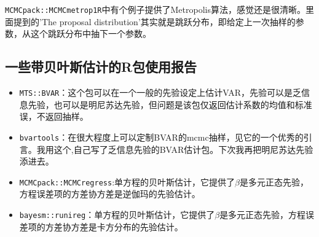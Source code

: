 \documentclass[
]{book}
\providecommand{\tightlist}{%
  \setlength{\itemsep}{0pt}\setlength{\parskip}{0pt}}
\begin{document}
\texttt{MCMCpack::MCMCmetrop1R}中有个例子提供了Metropolis算法，感觉还是很清晰。里面提到的'The proposal distribution'其实就是跳跃分布，即给定上一次抽样的参数，从这个跳跃分布中抽下一个参数。

\hypertarget{ux4e00ux4e9bux5e26ux8d1dux53f6ux65afux4f30ux8ba1ux7684rux5305ux4f7fux7528ux62a5ux544a}{%
\subsection{一些带贝叶斯估计的R包使用报告}\label{ux4e00ux4e9bux5e26ux8d1dux53f6ux65afux4f30ux8ba1ux7684rux5305ux4f7fux7528ux62a5ux544a}}

\begin{itemize}
\tightlist
\item
  \texttt{MTS::BVAR}：这个包可以在一个一般的先验设定上估计VAR，先验可以是乏信息先验，也可以是明尼苏达先验，但问题是该包仅返回估计系数的均值和标准误，不返回抽样。
\item
  \texttt{bvartools}：在很大程度上可以定制BVAR的mcmc抽样，见它的一个优秀的引言。我用这个,自己写了乏信息先验的BVAR估计包。下次我再把明尼苏达先验添进去。
\item
  \texttt{MCMCpack::MCMCregress}:单方程的贝叶斯估计，它提供了\(\beta\)是多元正态先验，方程误差项的方差协方差是逆伽玛的先验估计。
\item
  \texttt{bayesm::runireg}：单方程的贝叶斯估计，它提供了\(\beta\)是多元正态先验，方程误差项的方差协方差是卡方分布的先验估计。
\end{itemize}

  
\end{document}
